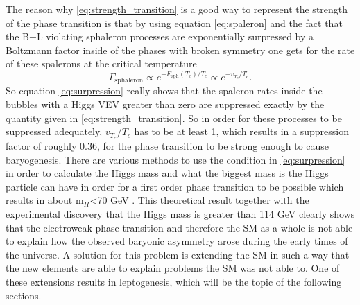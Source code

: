 The reason why \eqref{eq:strength_transition} is a good way to represent the strength of the phase transition is that by using equation \eqref{eq:spaleron} and the fact that the B+L violating sphaleron processes are exponentially surpressed by a Boltzmann factor inside of the phases with broken symmetry one gets for the rate of these spalerons at the critical temperature
\begin{equation}
	\Gamma_\text{sphaleron}\propto e^{-E_\text{sph}(T_c)/T_c}\propto e^{-v_{T_c}/T_c}.
	\label{eq:surpression}
\end{equation}
So equation \eqref{eq:surpression} really shows that the spaleron rates inside the bubbles with a Higgs VEV greater than zero are suppressed exactly by the quantity given in \eqref{eq:strength_transition}. So in order for these processes to be suppressed adequately, $v_{T_c}/T_c$ has to be at least 1, which results in a suppression factor of roughly 0.36, for the phase transition to be strong enough to cause baryogenesis. \newline\indent 
There are various methods to use the condition in \eqref{eq:surpression} in order to calculate the Higgs mass and what the biggest mass is the Higgs particle can have in order for a first order phase transition to be possible which results in about m$_H$<70 GeV \cite[pp. 3f.]{Fodor:1999at}. \newline\indent
This theoretical result together with the experimental discovery that the Higgs mass is greater than 114 GeV \cite[pp. 100ff.]{Abbaneo:2001ix} clearly shows that the electroweak phase transition and therefore the SM as a whole is not able to explain how the observed baryonic asymmetry arose during the early times of the universe. \newline\indent
A solution for this problem is extending the SM in such a way that the new elements are able to explain problems the SM was not able to. One of these extensions results in leptogenesis, which will be the topic of the following sections.